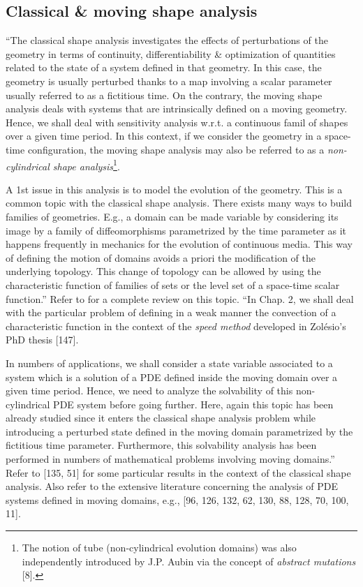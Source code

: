 \documentclass[oneside]{book}
\numberwithin{equation}{section}
\begin{document}
\subsection{Classical \& moving shape analysis}
``The classical shape analysis investigates the effects of perturbations of the geometry in terms of continuity, differentiability \& optimization of quantities related to the state of a system defined in that geometry. In this case, the geometry is usually perturbed thanks to a map involving a scalar parameter usually referred to as a fictitious time. On the contrary, the moving shape analysis deals with systems that are intrinsically defined on a moving geometry. Hence, we shall deal with sensitivity analysis w.r.t. a continuous famil of shapes over a given time period. In this context, if we consider the geometry in a space-time configuration, the moving shape analysis may also be referred to as a \textit{non-cylindrical shape analysis}\footnote{The notion of tube (non-cylindrical evolution domains) was also independently introduced by J.P. Aubin via the concept of \textit{abstract mutations} [8].}.

A 1st issue in this analysis is to model the evolution of the geometry. This is a common topic with the classical shape analysis. There exists many ways to build families of geometries. E.g., a domain can be made variable by considering its image by a family of diffeomorphisms parametrized by the time parameter as it happens frequently in mechanics for the evolution of continuous media. This way of defining the motion of domains avoids a priori the modification of the underlying topology. This change of topology can be allowed by using the characteristic function of families of sets or the level set of a space-time scalar function.'' Refer to \cite{Delfour_Zolesio2001, Delfour_Zolesio2011} for a complete review on this topic. ``In Chap. 2, we shall deal with the particular problem of defining in a weak manner the convection of a characteristic function in the context of the \textit{speed method} developed in Zol\'esio's PhD thesis [147].

In numbers of applications, we shall consider a state variable associated to a system which is a solution of a PDE defined inside the moving domain over a given time period. Hence, we need to analyze the solvability of this non-cylindrical PDE system before going further. Here, again this topic has been already studied since it enters the classical shape analysis problem while introducing a perturbed state defined in the moving domain parametrized by the fictitious time parameter. Furthermore, this solvability analysis has been performed in numbers of mathematical problems involving moving domains.'' Refer to [135, 51] for some particular results in the context of the classical shape analysis. Also refer to the extensive literature concerning the analysis of PDE systems defined in moving domains, e.g., [96, 126, 132, 62, 130, 88, 128, 70, 100, 11].
\end{document}
